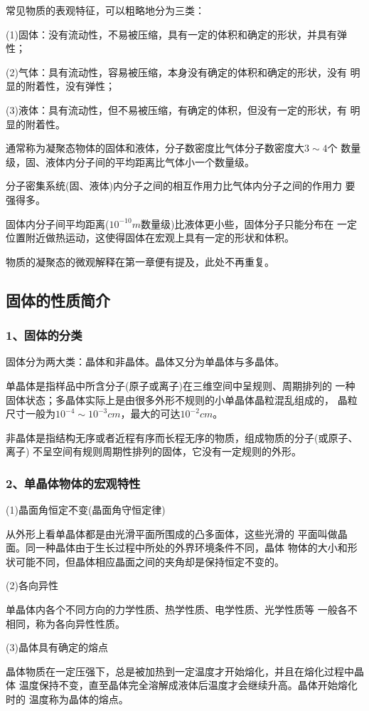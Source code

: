\begin{theorem}
    常见物质的表观特征，可以粗略地分为三类：
    
    (1)固体：没有流动性，不易被压缩，具有一定的体积和确定的形状，并具有弹性；
    
    (2)气体：具有流动性，容易被压缩，本身没有确定的体积和确定的形状，没有 
    明显的附着性，没有弹性；
    
    (3)液体：具有流动性，但不易被压缩，有确定的体积，但没有一定的形状，有 
    明显的附着性。
\end{theorem}

通常称为凝聚态物体的固体和液体，分子数密度比气体分子数密度大$3\sim 4$个 
数量级，固、液体内分子间的平均距离比气体小一个数量级。

分子密集系统(固、液体)内分子之间的相互作用力比气体内分子之间的作用力
要强得多。

固体内分子间平均距离($10^{-10}m$数量级)比液体更小些，固体分子只能分布在
一定位置附近做热运动，这使得固体在宏观上具有一定的形状和体积。

物质的凝聚态的微观解释在第一章便有提及，此处不再重复。
\subsection{固体的性质简介}
\subsubsection*{1、固体的分类}
\begin{theorem}
    固体分为两大类：晶体和非晶体。晶体又分为单晶体与多晶体。
    
    单晶体是指样品中所含分子(原子或离子)在三维空间中呈规则、周期排列的
    一种固体状态；多晶体实际上是由很多外形不规则的小单晶体晶粒混乱组成的，
    晶粒尺寸一般为$10^{-4}\sim 10^{-3}cm$，最大的可达$10^{-2}cm$。
    
    非晶体是指结构无序或者近程有序而长程无序的物质，组成物质的分子(或原子、离子)
    不呈空间有规则周期性排列的固体，它没有一定规则的外形。
\end{theorem}
\subsubsection*{2、单晶体物体的宏观特性}
\begin{theorem}
    (1)晶面角恒定不变(晶面角守恒定律)
    
    从外形上看单晶体都是由光滑平面所围成的凸多面体，这些光滑的
    平面叫做晶面。同一种晶体由于生长过程中所处的外界环境条件不同，晶体 
    物体的大小和形状可能不同，但晶体相应晶面之间的夹角却是保持恒定不变的。
    
    (2)各向异性
    
    单晶体内各个不同方向的力学性质、热学性质、电学性质、光学性质等
    一般各不相同，称为各向异性性质。
    
    (3)晶体具有确定的熔点
    
    晶体物质在一定压强下，总是被加热到一定温度才开始熔化，并且在熔化过程中晶体
    温度保持不变，直至晶体完全溶解成液体后温度才会继续升高。晶体开始熔化时的
    温度称为晶体的熔点。
\end{theorem}

